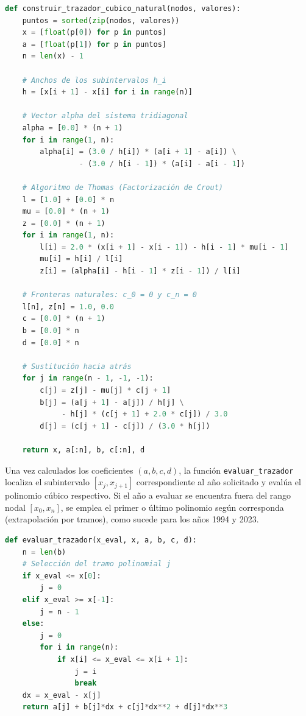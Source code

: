 \documentclass[11pt]{article}
\begin{document}
\begin{lstlisting}[language=Python, caption={Algoritmo de construcción del trazador cúbico natural}]
def construir_trazador_cubico_natural(nodos, valores):
    puntos = sorted(zip(nodos, valores))
    x = [float(p[0]) for p in puntos]
    a = [float(p[1]) for p in puntos]
    n = len(x) - 1

    # Anchos de los subintervalos h_i
    h = [x[i + 1] - x[i] for i in range(n)]

    # Vector alpha del sistema tridiagonal
    alpha = [0.0] * (n + 1)
    for i in range(1, n):
        alpha[i] = (3.0 / h[i]) * (a[i + 1] - a[i]) \
                 - (3.0 / h[i - 1]) * (a[i] - a[i - 1])

    # Algoritmo de Thomas (Factorización de Crout)
    l = [1.0] + [0.0] * n
    mu = [0.0] * (n + 1)
    z = [0.0] * (n + 1)
    for i in range(1, n):
        l[i] = 2.0 * (x[i + 1] - x[i - 1]) - h[i - 1] * mu[i - 1]
        mu[i] = h[i] / l[i]
        z[i] = (alpha[i] - h[i - 1] * z[i - 1]) / l[i]

    # Fronteras naturales: c_0 = 0 y c_n = 0
    l[n], z[n] = 1.0, 0.0
    c = [0.0] * (n + 1)
    b = [0.0] * n
    d = [0.0] * n

    # Sustitución hacia atrás
    for j in range(n - 1, -1, -1):
        c[j] = z[j] - mu[j] * c[j + 1]
        b[j] = (a[j + 1] - a[j]) / h[j] \
             - h[j] * (c[j + 1] + 2.0 * c[j]) / 3.0
        d[j] = (c[j + 1] - c[j]) / (3.0 * h[j])

    return x, a[:n], b, c[:n], d
\end{lstlisting}

Una vez calculados los coeficientes $(a, b, c, d)$, la función \texttt{evaluar\_trazador} localiza el subintervalo $[x_j, x_{j+1}]$ correspondiente al año solicitado y evalúa el polinomio cúbico respectivo. Si el año a evaluar se encuentra fuera del rango nodal $[x_0, x_n]$, se emplea el primer o último polinomio según corresponda (extrapolación por tramos), como sucede para los años 1994 y 2023.

\begin{lstlisting}[language=Python, caption={Evaluación del trazador en un punto dado}]
def evaluar_trazador(x_eval, x, a, b, c, d):
    n = len(b)
    # Selección del tramo polinomial j
    if x_eval <= x[0]:
        j = 0
    elif x_eval >= x[-1]:
        j = n - 1
    else:
        j = 0
        for i in range(n):
            if x[i] <= x_eval <= x[i + 1]:
                j = i
                break
    dx = x_eval - x[j]
    return a[j] + b[j]*dx + c[j]*dx**2 + d[j]*dx**3
\end{lstlisting}
\end{document}
